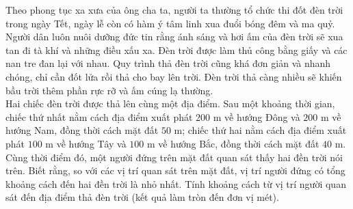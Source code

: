 \begin{ex}%
	Theo phong tục xa xưa của ông cha ta, người ta thường tổ chức thi đốt đèn trời trong ngày Tết, ngày lễ còn có hàm ý tâm linh xua đuổi bóng đêm và ma quỷ. Người dân luôn nuôi dưỡng đức tin rằng ánh sáng và hơi ấm của đèn trời sẽ xua tan đi tà khí và những điều xấu xa. Đèn trời được làm thủ công bằng giấy và các nan tre đan lại với nhau. Quy trình thả đèn trời cũng khá đơn giản và nhanh chóng, chỉ cần đốt lửa rồi thả cho bay lên trời. Đèn trời thả càng nhiều sẽ khiến bầu trời thêm phần rực rỡ và ấm cúng lạ thường.\\
	Hai chiếc đèn trời được thả lên cùng một địa điểm. Sau một khoảng thời gian, chiếc thứ nhất nằm cách địa điểm xuất phát $200$ m về hướng Đông và $200$ m về hướng Nam, đồng thời cách mặt đất $50$ m; chiếc thứ hai nằm cách địa điểm xuất phát $100$ m về hướng Tây và $100$ m về hướng Bắc, đồng thời cách mặt đất $40$ m. Cùng thời điểm đó, một người đứng trên mặt đất quan sát thấy hai đền trời nói trên. Biết rằng, so với các vị trí quan sát trên mặt đất, vị trí người đứng có tổng khoảng cách đến hai đền trời là nhỏ nhất. Tính khoảng cách từ vị trí người quan sát đến địa điểm thả đèn trời (kết quả làm tròn đến đơn vị mét). 
	

\end{ex}
